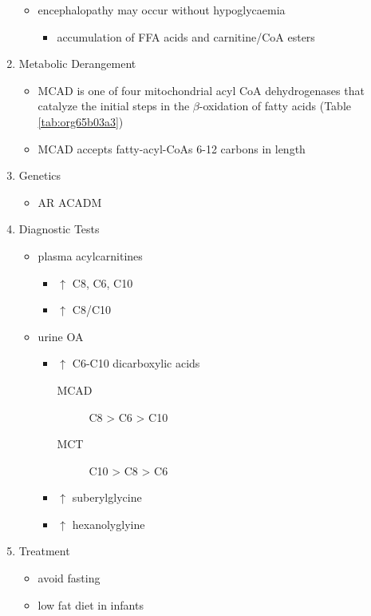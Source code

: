 \documentclass[12pt]{scrartcl}
\begin{document}
\begin{enumerate}
\begin{itemize}
\item encephalopathy may occur without hypoglycaemia
\begin{itemize}
\item accumulation of FFA acids and carnitine/CoA esters
\end{itemize}
\end{itemize}
\item Metabolic Derangement
\label{sec:org0e301aa}
\begin{itemize}
\item MCAD is one of four mitochondrial acyl CoA dehydrogenases that
catalyze the initial steps in the \(\beta\)-oxidation of fatty acids
(Table \ref{tab:org65b03a3})
\item MCAD accepts fatty-acyl-CoAs 6-12 carbons in length
\end{itemize}

\item Genetics
\label{sec:org90f2730}
\begin{itemize}
\item AR ACADM
\end{itemize}
\item Diagnostic Tests
\label{sec:orgec74904}
\begin{itemize}
\item plasma acylcarnitines
\begin{itemize}
\item \(\uparrow\) C8, C6, C10
\item \(\uparrow\) C8/C10
\end{itemize}
\item urine OA
\begin{itemize}
\item \(\uparrow\) C6-C10 dicarboxylic acids
\begin{description}
\item[{MCAD}] C8 > C6 > C10
\item[{MCT}] C10 > C8 > C6
\end{description}
\item \(\uparrow\) suberylglycine
\item \(\uparrow\) hexanolyglyine
\end{itemize}
\end{itemize}

\item Treatment
\label{sec:org44f0cd4}
\begin{itemize}
\item avoid fasting
\item low fat diet in infants
\end{itemize}
\end{enumerate}
\end{document}
